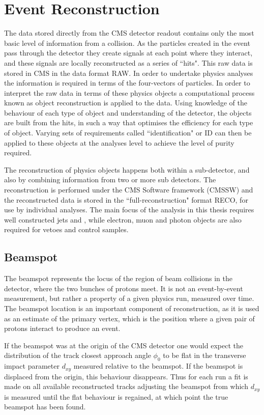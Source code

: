 \chapter{Event Reconstruction}
\label{ch:objects}
The data stored directly from the CMS detector readout contains only the most basic level of information from a collision. As the particles created in the event pass through the detector they create signals at each point where they interact, and these signals are locally reconstructed as a series of ``hits". This raw data is stored in CMS in the data format RAW. In order to undertake physics analyses the information is required in terms of the four-vectors of particles. In order to interpret the raw data in terms of these physics objects a computational process known as object reconstruction is applied to the data. Using knowledge of the behaviour of each type of object and understanding of the detector, the objects are built from the hits, in such a way that optimises the efficiency for each type of object. Varying sets of requirements called ``identification" or ID can then be applied to these objects at the analyses level to achieve the level of purity required. 

The reconstruction of physics objects happens both within a sub-detector, and also by combining information from two or more sub detectors. The reconstruction is performed under the CMS Software framework (CMSSW) and the reconstructed data is stored in the ``full-reconstruction" format RECO, for use by individual analyses. The main focus of the analysis in this thesis requires well constructed jets and \met, while electron, muon and photon objects are also required for vetoes and control samples. 

\section{Beamspot}

The beamspot represents the locus of the region of beam collisions in the detector, where the two bunches of protons meet. It is not an event-by-event measurement, but rather a property of a given physics run, measured over time. The beamspot location is an important component of reconstruction, as it is used as an estimate of the primary vertex, which is the position where a given pair of  protons interact to produce an event.

If the beamspot was at the origin of the CMS detector one would expect the distribution of the track closest approach angle $\phi_{0}$ to be flat in the transverse impact parameter $d_{xy}$ measured relative to the beamspot. If the beamspot is displaced from the origin, this behaviour disappears. Thus for each run a fit is made on all available reconstructed tracks adjusting the beamspot from which $d_{xy}$ is measured until the flat behaviour is regained, at which point the true beamspot has been found. 
 

